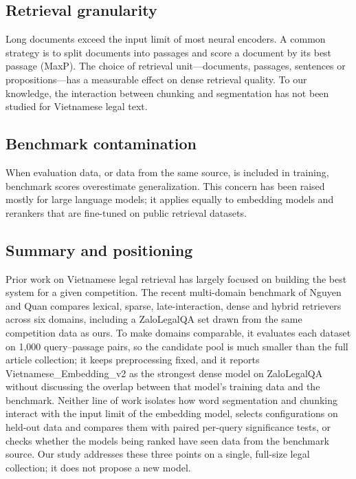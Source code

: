\documentclass{ws-vjcs}
\begin{document}
\subsection{Retrieval granularity}

Long documents exceed the input limit of most neural encoders. A common strategy is to split documents into passages and score a document by its best passage (MaxP).\cite{dai2019maxp} The choice of retrieval unit---documents, passages, sentences or propositions---has a measurable effect on dense retrieval quality.\cite{chen2024densex} To our knowledge, the interaction between chunking and segmentation has not been studied for Vietnamese legal text.

\subsection{Benchmark contamination}

When evaluation data, or data from the same source, is included in training, benchmark scores overestimate generalization.\cite{magar2022contamination,sainz2023contamination} This concern has been raised mostly for large language models; it applies equally to embedding models and rerankers that are fine-tuned on public retrieval datasets.

\subsection{Summary and positioning}

Prior work on Vietnamese legal retrieval has largely focused on building the best system for a given competition. The recent multi-domain benchmark of Nguyen and Quan\cite{nguyen2026vire} compares lexical, sparse, late-interaction, dense and hybrid retrievers across six domains, including a ZaloLegalQA set drawn from the same competition data as ours. To make domains comparable, it evaluates each dataset on 1,000 query--passage pairs, so the candidate pool is much smaller than the full article collection; it keeps preprocessing fixed, and it reports Vietnamese\_Embedding\_v2 as the strongest dense model on ZaloLegalQA without discussing the overlap between that model's training data and the benchmark. Neither line of work isolates how word segmentation and chunking interact with the input limit of the embedding model, selects configurations on held-out data and compares them with paired per-query significance tests, or checks whether the models being ranked have seen data from the benchmark source. Our study addresses these three points on a single, full-size legal collection; it does not propose a new model.
\end{document}
